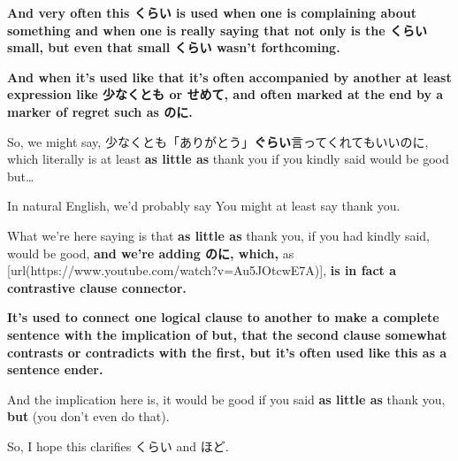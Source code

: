 \startsectionlevel[title={くらい as complaining about something},reference={くらい-as-complaining-about-something}]

{\bf And very often this くらい is used when one is complaining about something and when one is really saying that not only is the くらい small, but even that small くらい wasn't forthcoming.}

{\bf And when it's used like that it's often accompanied by another at least expression like 少なくとも or せめて, and often marked at the end by a marker of regret such as のに.}

\thinrule

So, we might say, 少なくとも「ありがとう」{\bf ぐらい}言ってくれてもいいのに, which literally is at least {\bf as little as} thank you if you kindly said would be good but\ldots{}

{}

In natural English, we'd probably say You might at least say thank you.

What we're here saying is that {\bf as little as} thank you, if you had kindly said, would be good, {\bf and we're adding のに, which,} as [url(https://www.youtube.com/watch?v=Au5JOtcwE7A)], {\bf is in fact a contrastive clause connector.}

{\bf It's used to connect one logical clause to another to make a complete sentence with the implication of but, that the second clause somewhat contrasts or contradicts with the first, but it's often used like this as a sentence ender.}

And the implication here is, it would be good if you said {\bf as little as} thank you, {\bf but} (you don't even do that).

So, I hope this clarifies くらい and ほど.

\stopsectionlevel

\stopsectionlevel

\stopsectionlevel

\stopsectionlevel
